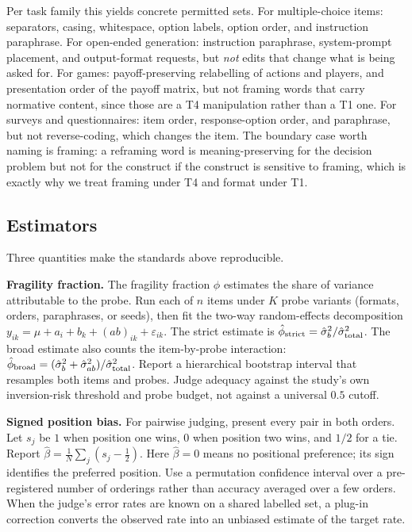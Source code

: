 \documentclass[11pt]{article}
\begin{document}
Per task family this yields concrete permitted sets. For multiple-choice items:
separators, casing, whitespace, option labels, option order, and instruction
paraphrase. For open-ended generation: instruction paraphrase, system-prompt
placement, and output-format requests, but \emph{not} edits that change what is
being asked for. For games: payoff-preserving relabelling of actions and
players, and presentation order of the payoff matrix, but not framing words that
carry normative content, since those are a T4 manipulation rather than a T1 one.
For surveys and questionnaires: item order, response-option order, and
paraphrase, but not reverse-coding, which changes the item. The boundary case
worth naming is framing: a reframing word is meaning-preserving for the
decision problem but not for the construct if the construct is sensitive to
framing, which is exactly why we treat framing under T4 and format under T1.

\subsection{Estimators}
\label{app:estimators}

Three quantities make the standards above reproducible.

\textbf{Fragility fraction.} The fragility fraction $\phi$ estimates the share
of variance attributable to the probe. Run each of $n$ items under $K$ probe
variants (formats, orders, paraphrases, or seeds), then fit the two-way
random-effects decomposition $y_{ik}=\mu+a_i+b_k+(ab)_{ik}+\varepsilon_{ik}$.
The strict estimate is $\hat\phi_{\rm strict}=\hat\sigma^2_b/
\hat\sigma^2_{\rm total}$. The broad estimate also counts the item-by-probe
interaction: $\hat\phi_{\rm broad}=(\hat\sigma^2_b+\hat\sigma^2_{ab})/
\hat\sigma^2_{\rm total}$. Report a hierarchical bootstrap interval that
resamples both items and probes. Judge adequacy against the study's own
inversion-risk threshold and probe budget, not against a universal $0.5$ cutoff.

\textbf{Signed position bias.} For pairwise judging, present every pair in both
orders. Let $s_j$ be $1$ when position one wins, $0$ when position two wins, and
$1/2$ for a tie. Report $\hat\beta=\tfrac1N\sum_j(s_j-\tfrac12)$.
Here $\hat\beta=0$ means no positional preference; its sign
identifies the preferred position. Use a permutation confidence interval over a
pre-registered number of orderings rather than accuracy averaged over a few
orders. When the judge's error rates are known on a shared labelled set, a
plug-in correction \cite{angelopoulos2023ppi} converts the observed rate into an
unbiased estimate of the target rate.
\end{document}
